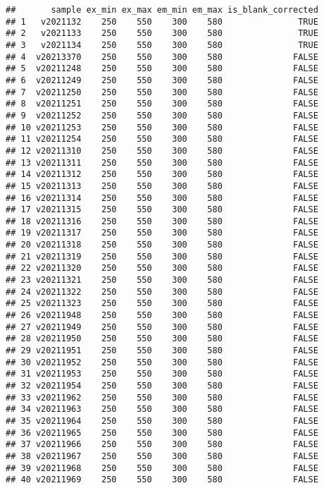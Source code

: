 \documentclass[
]{article}
\begin{document}
\begin{verbatim}
##       sample ex_min ex_max em_min em_max is_blank_corrected
## 1   v2021132    250    550    300    580               TRUE
## 2   v2021133    250    550    300    580               TRUE
## 3   v2021134    250    550    300    580               TRUE
## 4  v20213370    250    550    300    580              FALSE
## 5  v20211248    250    550    300    580              FALSE
## 6  v20211249    250    550    300    580              FALSE
## 7  v20211250    250    550    300    580              FALSE
## 8  v20211251    250    550    300    580              FALSE
## 9  v20211252    250    550    300    580              FALSE
## 10 v20211253    250    550    300    580              FALSE
## 11 v20211254    250    550    300    580              FALSE
## 12 v20211310    250    550    300    580              FALSE
## 13 v20211311    250    550    300    580              FALSE
## 14 v20211312    250    550    300    580              FALSE
## 15 v20211313    250    550    300    580              FALSE
## 16 v20211314    250    550    300    580              FALSE
## 17 v20211315    250    550    300    580              FALSE
## 18 v20211316    250    550    300    580              FALSE
## 19 v20211317    250    550    300    580              FALSE
## 20 v20211318    250    550    300    580              FALSE
## 21 v20211319    250    550    300    580              FALSE
## 22 v20211320    250    550    300    580              FALSE
## 23 v20211321    250    550    300    580              FALSE
## 24 v20211322    250    550    300    580              FALSE
## 25 v20211323    250    550    300    580              FALSE
## 26 v20211948    250    550    300    580              FALSE
## 27 v20211949    250    550    300    580              FALSE
## 28 v20211950    250    550    300    580              FALSE
## 29 v20211951    250    550    300    580              FALSE
## 30 v20211952    250    550    300    580              FALSE
## 31 v20211953    250    550    300    580              FALSE
## 32 v20211954    250    550    300    580              FALSE
## 33 v20211962    250    550    300    580              FALSE
## 34 v20211963    250    550    300    580              FALSE
## 35 v20211964    250    550    300    580              FALSE
## 36 v20211965    250    550    300    580              FALSE
## 37 v20211966    250    550    300    580              FALSE
## 38 v20211967    250    550    300    580              FALSE
## 39 v20211968    250    550    300    580              FALSE
## 40 v20211969    250    550    300    580              FALSE

\end{verbatim}
\end{document}

